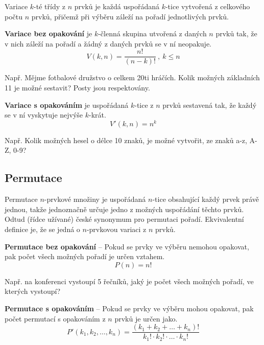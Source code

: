 \begin{compactitem}
    \item Variace $k$-té třídy z $n$ prvků je každá uspořádaná $k$-tice vytvořená z celkového počtu $n$ prvků, přičemž při výběru záleží na pořadí jednotlivých prvků.

    \item \textbf{Variace bez opakování} je $k$-členná skupina utvořená z daných $n$ prvků tak, že v nich záleží na pořadí a žádný z daných prvků se v ní neopakuje.
    $$ V(k, n) = \frac{n!}{(n-k)!} ~,~ k \leq n $$ \begin{compactitem}
        \item Např. Mějme fotbalové družstvo o celkem 20ti hráčích. Kolik možných základních 11 je možné sestavit? Posty jsou respektovány.
    \end{compactitem}

    \item \textbf{Variace s opakováním} je uspořádaná $k$-tice z $n$ prvků sestavená tak, že každý se v ní vyskytuje nejvýše $k$-krát.
    $$ V'(k, n) = n^k $$ \begin{compactitem}
        \item Např. Kolik možných hesel o délce 10 znaků, je možné vytvořit, ze znaků a-z, A-Z, 0-9?
    \end{compactitem}
\end{compactitem}

\subsection{Permutace}

\begin{compactitem}
    \item Permutace $n$-prvkové množiny je uspořádaná $n$-tice obsahující každý prvek právě jednou, takže jednoznačně určuje jedno z možných uspořádání těchto prvků. Odtud (řídce užívané) české synonymum pro permutaci pořadí. Ekvivalentní definice je, že se jedná o $n$-prvkovou variaci z $n$ prvků.

    \item \textbf{Permutace bez opakování} -- Pokud se prvky ve výběru nemohou opakovat, pak počet všech možných pořadí je určen vztahem.
    $$ P(n) = n! $$ \begin{compactitem}
        \item Např. na konferenci vystoupí 5 řečníků, jaký je počet všech možných pořadí, ve kterých vystoupí?
    \end{compactitem}

    \item \textbf{Permutace s opakováním} -- Pokud se prvky ve výběru mohou opakovat, pak počet permutací s opakováním z $n$ prvků je určen jako.
    $$ P'{(k_1,k_2,\ldots,k_n)} = \frac {(k_1+k_2+\ldots+k_n)!}{{k_1!}\cdot{k_2!}\cdot\ldots\cdot{k_n!}} $$
\end{compactitem}

